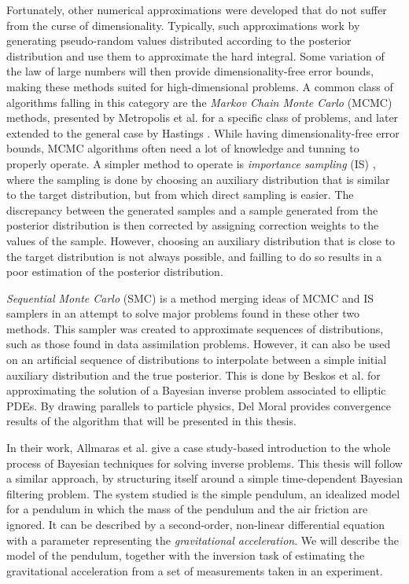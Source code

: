 Fortunately, other numerical approximations were developed that do not suffer from the curse of dimensionality. Typically, such approximations work by generating pseudo-random values distributed according to the posterior distribution and use them to approximate the hard integral. Some variation of the law of large numbers will then provide dimensionality-free error bounds, making these methods suited for high-dimensional problems. A common class of algorithms falling in this category are the \textit{Markov Chain Monte Carlo} (MCMC) methods, presented by Metropolis et al. \cite{metropolis1953equation} for a specific class of problems, and later extended to the general case by Hastings \cite{hastings1970monte}. While having dimensionality-free error bounds, MCMC algorithms often need a lot of knowledge and tunning to properly operate. A simpler method to operate is \textit{importance sampling} (IS) , where the sampling is done by choosing an auxiliary distribution that is similar to the target distribution, but from which direct sampling is easier. The discrepancy between the generated samples and a sample generated from the posterior distribution is then corrected by assigning correction weights to the values of the sample. However, choosing an auxiliary distribution that is close to the target distribution is not always possible, and failling to do so results in a poor estimation of the posterior distribution.

\textit{Sequential Monte Carlo} (SMC) \cite{del_moral_2006} is a method merging ideas of MCMC and IS samplers in an attempt to solve major problems found in these other two methods. This sampler was created to approximate sequences of distributions, such as those found in data assimilation problems. However, it can also be used on an artificial sequence of distributions to interpolate between a simple initial auxiliary distribution and the true posterior. This is done by Beskos et al. \cite{beskos2015sequential} for approximating the solution of a Bayesian inverse problem associated to elliptic PDEs. By drawing parallels to particle physics, Del Moral \cite{del2013mean, del2004feynman} provides convergence results of the algorithm that will be presented in this thesis.

In their work, Allmaras et al. \cite{bayes-tutorial} give a case study-based introduction to the whole process of Bayesian techniques for solving inverse problems. This thesis will follow a similar approach, by structuring itself around a simple time-dependent Bayesian filtering problem. The system studied is the simple pendulum, an idealized model for a pendulum in which the mass of the pendulum and the air friction are ignored. It can be described by a second-order, non-linear differential equation with a parameter representing the \textit{gravitational acceleration}. We will describe the model of the pendulum, together with the inversion task of estimating the gravitational acceleration from a set of measurements taken in an experiment. 


